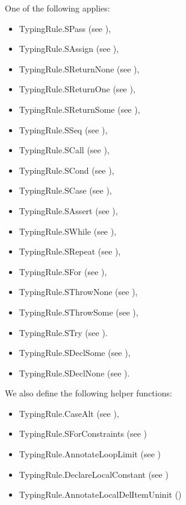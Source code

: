 \documentclass{book}
\begin{document}
One of the following applies:
\begin{itemize}
  \item TypingRule.SPass (see ),
  \item TypingRule.SAssign (see ),
  \item TypingRule.SReturnNone (see ),
  \item TypingRule.SReturnOne (see ),
  \item TypingRule.SReturnSome (see ),
  \item TypingRule.SSeq (see ),
  \item TypingRule.SCall (see ),
  \item TypingRule.SCond (see ),
  \item TypingRule.SCase (see ),
  \item TypingRule.SAssert (see ),
  \item TypingRule.SWhile (see ),
  \item TypingRule.SRepeat (see ),
  \item TypingRule.SFor (see ),
  \item TypingRule.SThrowNone (see ),
  \item TypingRule.SThrowSome (see ),
  \item TypingRule.STry (see ).
  \item TypingRule.SDeclSome (see ),
  \item TypingRule.SDeclNone (see ).
\end{itemize}

We also define the following helper functions:
\begin{itemize}
  \item TypingRule.CaseAlt (see ),
  \item TypingRule.SForConstraints (see )
  \item TypingRule.AnnotateLoopLimit (see )
  \item TypingRule.DeclareLocalConstant (see )
  \item TypingRule.AnnotateLocalDelItemUninit ()
\end{itemize}
\end{document}
